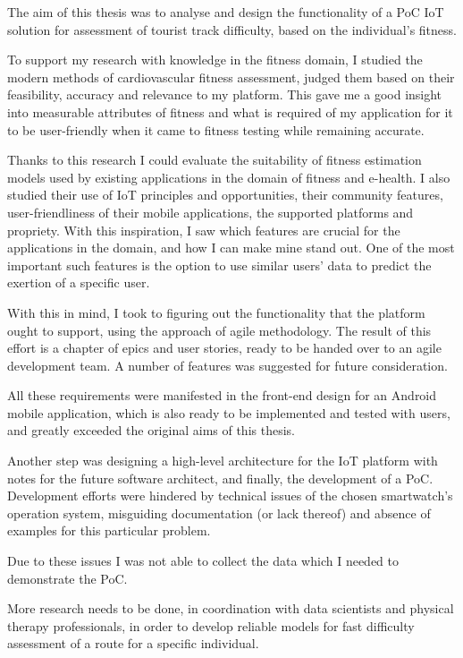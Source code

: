 The aim of this thesis was to analyse and design the functionality of a PoC IoT solution for assessment of tourist track difficulty, based on the individual's fitness.

To support my research with knowledge in the fitness domain, I studied the modern methods of cardiovascular fitness assessment, judged them based on their feasibility, accuracy and relevance to my platform.
This gave me a good insight into measurable attributes of fitness and what is required of my application for it to be user-friendly when it came to fitness testing while remaining accurate.

Thanks to this research I could evaluate the suitability of fitness estimation models used by existing applications in the domain of fitness and e-health.
I also studied their use of IoT principles and opportunities, their community features, user-friendliness of their mobile applications, the supported platforms and propriety.
With this inspiration, I saw which features are crucial for the applications in the domain, and how I can make mine stand out.
One of the most important such features is the option to use similar users' data to predict the exertion of a specific user.

With this in mind, I took to figuring out the functionality that the platform ought to support, using the approach of agile methodology.
The result of this effort is a chapter of epics and user stories, ready to be handed over to an agile development team.
A number of features was suggested for future consideration.

All these requirements were manifested in the front-end design for an Android mobile application, which is also ready to be implemented and tested with users, and greatly exceeded the original aims of this thesis.

Another step was designing a high-level architecture for the IoT platform with notes for the future software architect, and finally, the development of a PoC.
Development efforts were hindered by technical issues of the chosen smartwatch's operation system, misguiding documentation (or lack thereof) and absence of examples for this particular problem.

Due to these issues I was not able to collect the data which I needed to demonstrate the PoC.

More research needs to be done, in coordination with data scientists and physical therapy professionals, in order to develop reliable models for fast difficulty assessment of a route for a specific individual.